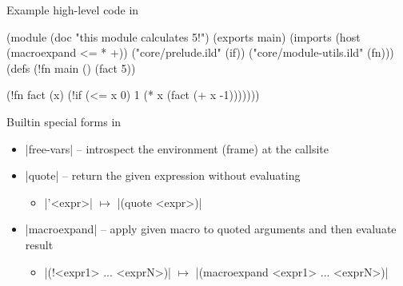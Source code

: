 \begin{frame}[fragile]{Example high-level code in \lang}
\begin{listingbox}\begin{ildcode}
(module
  (doc "this module calculates 5!")
  (exports main)
  (imports
    (host (macroexpand <= * +))
    ("core/prelude.ild" (if))
    ("core/module-utils.ild" (fn)))
  (defs
    (!fn main () (fact 5))

    (!fn fact (x)
      (!if (<= x 0)
        1
        (* x (fact (+ x -1)))))))
\end{ildcode}\end{listingbox}
\end{frame}

\begin{frame}[fragile]{Builtin special forms in \lang}
\begin{itemize}
  \item \linline|free-vars| -- introspect the environment (frame) at the callsite
  \item \linline|quote| -- return the given expression without evaluating
  \begin{itemize}
    \item \linline|'<expr>| \(\mapsto\) \linline|(quote <expr>)|
  \end{itemize}
  \item \linline|macroexpand| -- apply given macro to quoted arguments and then evaluate result
  \begin{itemize}
    \item \linline|(!<expr1> ... <exprN>)| \(\mapsto\) \linline|(macroexpand <expr1> ... <exprN>)|
  \end{itemize}
\end{itemize}
\end{frame}

